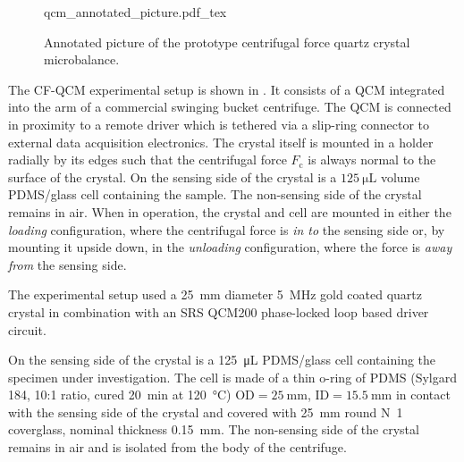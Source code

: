\begin{figure}[ht]
\centering
{qcm_annotated_picture.pdf_tex}
\caption{Annotated picture of the prototype centrifugal force quartz
crystal microbalance.}
\label{fig:cfqcmexpsetup}
\end{figure}
The CF-QCM experimental setup is shown in .  It
consists of a QCM integrated into the arm of a commercial swinging bucket
centrifuge.  The QCM is connected in proximity to a remote driver which is
tethered via a slip-ring connector to external data acquisition
electronics.  The crystal itself is mounted in a holder radially by its
edges such that the centrifugal force $F_\mathrm{c}$ is always normal to
the surface of the crystal.  On the sensing side of the crystal is a
$\SI{125}{\micro\liter}$ volume PDMS/glass cell containing the sample.  The
non-sensing side of the crystal remains in air.  When in operation, the
crystal and cell are mounted in either the \textit{loading} configuration,
where the centrifugal force is \textit{in to} the sensing side or, by
mounting it upside down, in the \textit{unloading} configuration, where the
force is \textit{away from} the sensing side.

The experimental setup used a \SI{25}{\milli\meter} diameter
\SI{5}{\mega\hertz} gold coated quartz crystal in combination with an SRS
QCM200 phase-locked loop based driver circuit.  


On the sensing side of the crystal is a
\SI{125}{\micro\liter} PDMS/glass cell containing the specimen under
investigation.  The cell is made of a thin o-ring of PDMS (Sylgard 184,
10:1 ratio, cured \SI{20}{\minute} at \SI{120}{\celsius})
$\text{OD}=\SI{25}{\milli\meter}$, $\text{ID}=\SI{15.5}{\milli\meter}$ in
contact with the sensing side of the crystal and covered with
\SI{25}{\milli\meter} round N~1
coverglass, nominal thickness \SI{0.15}{\milli\meter}.  The non-sensing
side of the crystal remains in air and is isolated from the body of the
centrifuge.  
